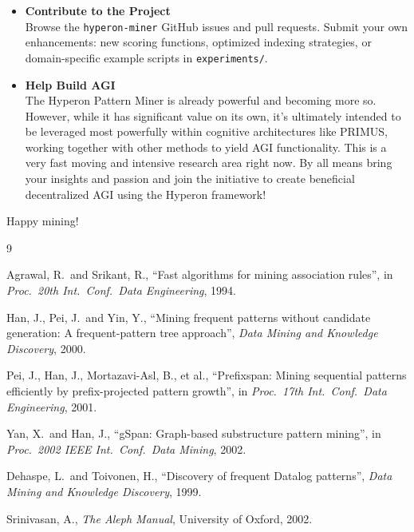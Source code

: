 \documentclass{article}
\begin{document}
\begin{itemize}
  \item \textbf{Contribute to the Project}\\
    Browse the \texttt{hyperon-miner} GitHub issues and pull requests.  Submit your own enhancements: new scoring functions, optimized indexing strategies, or domain-specific example scripts in \texttt{experiments/}.

  \item \textbf{Help Build AGI}\\
    The Hyperon Pattern Miner is already powerful and becoming more so.   However, while it has significant value on its own, it's ultimately intended to be leveraged most powerfully within cognitive architectures like PRIMUS, working together with other methods to yield AGI functionality.   This is a very fast moving and intensive research area right now.    By all means bring your insights and passion and join the initiative to create beneficial decentralized AGI using the Hyperon framework!
    
\end{itemize}

Happy mining!



\begin{thebibliography}{9}

Agrawal, R.\ and Srikant, R.,
``Fast algorithms for mining association rules'',
in \emph{Proc.\ 20th Int.\ Conf.\ Data Engineering}, 1994.

Han, J., Pei, J.\ and Yin, Y.,
``Mining frequent patterns without candidate generation:
  A frequent-pattern tree approach'',
\emph{Data Mining and Knowledge Discovery}, 2000.

Pei, J., Han, J., Mortazavi-Asl, B., et al.,
``Prefixspan: Mining sequential patterns efficiently
  by prefix-projected pattern growth'',
in \emph{Proc.\ 17th Int.\ Conf.\ Data Engineering}, 2001.

Yan, X.\ and Han, J.,
``gSpan: Graph-based substructure pattern mining'',
in \emph{Proc.\ 2002 IEEE Int.\ Conf.\ Data Mining}, 2002.

Dehaspe, L.\ and Toivonen, H.,
``Discovery of frequent Datalog patterns'',
\emph{Data Mining and Knowledge Discovery}, 1999.

Srinivasan, A.,
\emph{The Aleph Manual},
University of Oxford, 2002.



\end{thebibliography}
\end{document}
